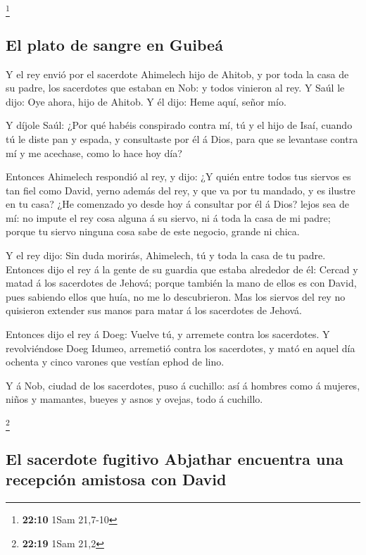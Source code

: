 \footnote{\textbf{22:10} 1Sam 21,7-10}

\hypertarget{el-plato-de-sangre-en-guibeuxe1}{%
\subsection{El plato de sangre en
Guibeá}\label{el-plato-de-sangre-en-guibeuxe1}}

 Y el rey envió por el sacerdote Ahimelech hijo de
Ahitob, y por toda la casa de su padre, los sacerdotes que estaban en
Nob: y todos vinieron al rey.  Y Saúl le dijo: Oye ahora,
hijo de Ahitob. Y él dijo: Heme aquí, señor mío.

 Y díjole Saúl: ¿Por qué habéis conspirado contra mí, tú
y el hijo de Isaí, cuando tú le diste pan y espada, y consultaste por él
á Dios, para que se levantase contra mí y me acechase, como lo hace hoy
día?

 Entonces Ahimelech respondió al rey, y dijo: ¿Y quién
entre todos tus siervos es tan fiel como David, yerno además del rey, y
que va por tu mandado, y es ilustre en tu casa?  ¿He
comenzado yo desde hoy á consultar por él á Dios? lejos sea de mí: no
impute el rey cosa alguna á su siervo, ni á toda la casa de mi padre;
porque tu siervo ninguna cosa sabe de este negocio, grande ni chica.

 Y el rey dijo: Sin duda morirás, Ahimelech, tú y toda la
casa de tu padre.  Entonces dijo el rey á la gente de su
guardia que estaba alrededor de él: Cercad y matad á los sacerdotes de
Jehová; porque también la mano de ellos es con David, pues sabiendo
ellos que huía, no me lo descubrieron. Mas los siervos del rey no
quisieron extender sus manos para matar á los sacerdotes de Jehová.

 Entonces dijo el rey á Doeg: Vuelve tú, y arremete
contra los sacerdotes. Y revolviéndose Doeg Idumeo, arremetió contra los
sacerdotes, y mató en aquel día ochenta y cinco varones que vestían
ephod de lino.

 Y á Nob, ciudad de los sacerdotes, puso á cuchillo: así
á hombres como á mujeres, niños y mamantes, bueyes y asnos y ovejas,
todo á cuchillo.

\footnote{\textbf{22:19} 1Sam 21,2}

\hypertarget{el-sacerdote-fugitivo-abjathar-encuentra-una-recepciuxf3n-amistosa-con-david}{%
\subsection{El sacerdote fugitivo Abjathar encuentra una recepción
amistosa con
David}\label{el-sacerdote-fugitivo-abjathar-encuentra-una-recepciuxf3n-amistosa-con-david}}

